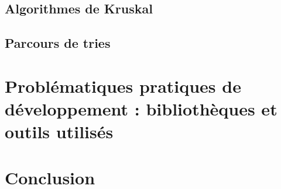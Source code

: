 \documentclass[a4paper]{article}
\begin{document}
\subsection{Algorithmes de Kruskal}

\subsection{Parcours de tries}

\section{Problématiques pratiques de développement : bibliothèques et outils utilisés}


\section*{Conclusion}
\end{document}
